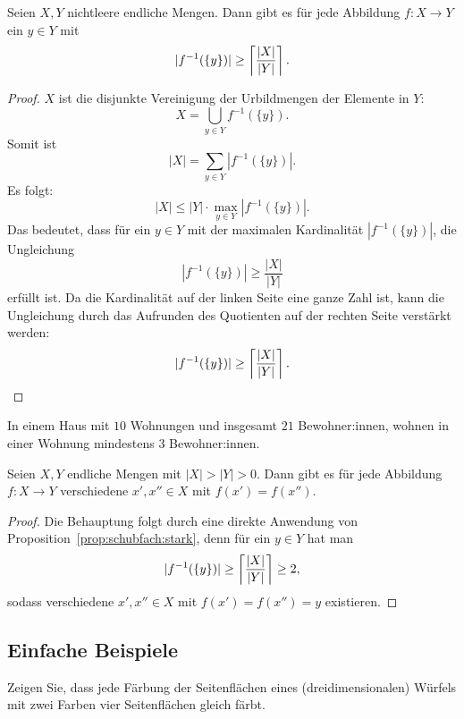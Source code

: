 \begin{prop} \label{prop:schubfach:stark}
	Seien $X, Y$ nichtleere endliche Mengen. Dann gibt es für jede Abbildung $f: X \to Y$ ein $y \in Y$ mit 
	\[
		|f^{-1} (\{y\})|  \ge  \left\lceil \frac{|X|}{|Y|} \right\rceil .
	\]
\end{prop} 
\begin{proof} $X$ ist die disjunkte Vereinigung der Urbildmengen der Elemente in $Y$:
	\[
			X = \bigcup_{y \in Y} f^{-1}(\{y\}) .
	\]
	Somit ist 
	\[
		|X| = \sum_{y \in Y} | f^{-1}(\{y\}) | .
	\]
	Es folgt: 
	\[
		|X| \le |Y| \cdot \max_{y \in Y} |f^{-1}(\{y\}) |. 
	\]
	Das bedeutet, dass für ein $y \in Y$ mit der maximalen Kardinalität $|f^{-1}(\{y\}) |$, die Ungleichung 
	\[
			|f^{-1}(\{y\})| \ge \frac{|X|}{|Y|}
	\]
	erfüllt ist. Da die Kardinalität auf der linken Seite eine ganze Zahl ist, kann die Ungleichung durch das Aufrunden des Quotienten auf der rechten Seite verstärkt werden: 
	\[
			|f^{-1}(\{y\})| \ge \left\lceil \frac{|X|}{|Y|} \right\rceil.
	\]
\end{proof} 


\begin{bsp}
	In einem Haus mit $10$ Wohnungen und insgesamt $21$ Bewohner:innen, wohnen in einer Wohnung mindestens $3$ Bewohner:innen. 
\end{bsp} 

\begin{kor} 
	Seien $X, Y$ endliche Mengen mit $|X| > |Y| >0$. Dann gibt es für jede Abbildung $f : X \to Y$ verschiedene $x',x''\in X$ mit $f(x')=f(x'')$. 
\end{kor} 
\begin{proof}
	Die Behauptung folgt durch eine direkte Anwendung von Proposition~\ref{prop:schubfach:stark}, denn für ein $y \in Y$ hat man 
	\[
		| f^{-1}(\{y\}) | \ge \left\lceil \frac{|X|}{|Y|} \right\rceil \ge 2,
	\]
	sodass verschiedene $x',x'' \in X$ mit $f(x') = f(x'') =y$ existieren. 
\end{proof} 


\subsection{Einfache Beispiele} 

\begin{aufg}
	Zeigen Sie, dass jede Färbung der Seitenflächen eines (dreidimensionalen) Würfels mit zwei Farben vier Seitenflächen gleich färbt. 
\end{aufg} 


